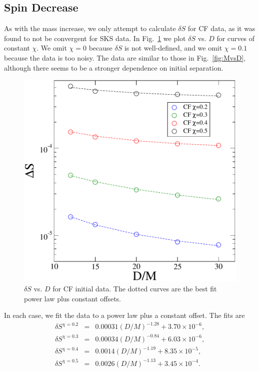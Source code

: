\subsection{Spin Decrease}
\label{subsec:SpinDecrease}
As with the mass increase, we only attempt to calculate $\delta S$ for CF data, as it was found to not be convergent for SKS
data. In Fig.~\ref{fig:SvsD} we plot $\delta S$ vs. $D$ for
curves of constant $\chi$. We omit $\chi=0$ because $\delta
  S$ is not well-defined, and we omit $\chi=0.1$ because the
  data is too noisy. The data are similar to those in
Fig.~\ref{fig:MvsD}, although there seems to be a stronger dependence on initial separation.

\begin{figure}[!htbp]
 \includegraphics[scale=0.95]{chap5/SvsD2}
  \caption[$\delta S$ vs. $D$ for CF initial data.]{$\delta S$ vs. $D$ for CF initial data. The dotted
    curves are the best fit power law plus constant offsets.}
  \label{fig:SvsD}
\end{figure}

In each case, we fit the data to
a power law plus a constant offset. The fits are
\begin{eqnarray*}
\delta S^{\chi = 0.2} &=&
0.00031\left(D/M\right)^{-1.28}+3.70\times 10^{-6}, \\
\delta S^{\chi = 0.3} &=&
0.00034\left(D/M\right)^{-0.84}+6.03\times 10^{-6}, \\
\delta S^{\chi = 0.4} &=&
0.0014\left(D/M\right)^{-1.19}+8.35\times 10^{-5}, \\
\delta S^{\chi = 0.5} &=&
0.0026\left(D/M\right)^{-1.13}+3.45\times 10^{-4}.
\end{eqnarray*}


